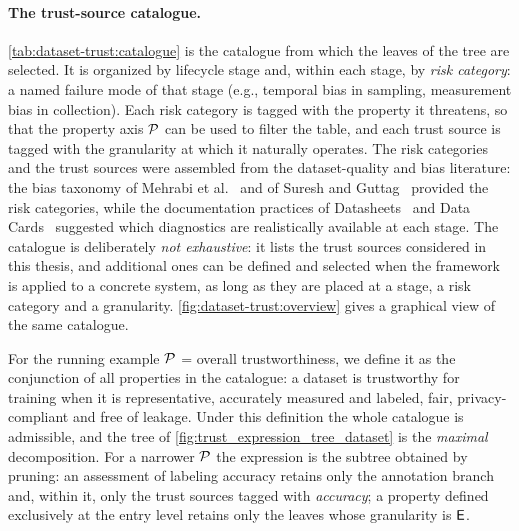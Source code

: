 \paragraph{The trust-source catalogue.}
\cref{tab:dataset-trust:catalogue} is the catalogue from which the leaves of the tree are selected. It is organized by lifecycle stage and, within each stage, by \emph{risk category}: a named failure mode of that stage (e.g., temporal bias in sampling, measurement bias in collection). Each risk category is tagged with the property it threatens, so that the property axis $\mathcal{P}$ can be used to filter the table, and each trust source is tagged with the granularity at which it naturally operates. The risk categories and the trust sources were assembled from the dataset-quality and bias literature: the bias taxonomy of Mehrabi et al.~\cite{10.1145/3457607} and of Suresh and Guttag~\cite{Suresh_2021} provided the risk categories, while the documentation practices of Datasheets~\cite{gebru2018datasheets} and Data Cards~\cite{Pushkarna2022DataCP} suggested which diagnostics are realistically available at each stage. The catalogue is deliberately \emph{not exhaustive}: it lists the trust sources considered in this thesis, and additional ones can be defined and selected when the framework is applied to a concrete system, as long as they are placed at a stage, a risk category and a granularity. \cref{fig:dataset-trust:overview} gives a graphical view of the same catalogue.

For the running example $\mathcal{P}$ = overall trustworthiness, we define it as the conjunction of all properties in the catalogue: a dataset is trustworthy for training when it is representative, accurately measured and labeled, fair, privacy-compliant and free of leakage. Under this definition the whole catalogue is admissible, and the tree of \cref{fig:trust_expression_tree_dataset} is the \emph{maximal} decomposition. For a narrower $\mathcal{P}$ the expression is the subtree obtained by pruning: an assessment of labeling accuracy retains only the annotation branch and, within it, only the trust sources tagged with \emph{accuracy}; a property defined exclusively at the entry level retains only the leaves whose granularity is $\textsf{E}$.


